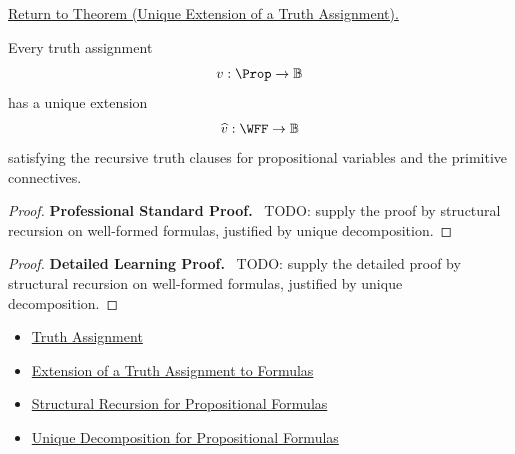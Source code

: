 \newpage
{}
\label{prf:unique-extension-truth-assignment-propositional-logic}

\begin{remark*}[Return]
\hyperref[thm:unique-extension-truth-assignment-propositional-logic]{Return to Theorem (Unique Extension of a Truth Assignment).}
\end{remark*}

\begin{theorem*}
Every truth assignment
\[
v:\Prop\to\mathbb{B}
\]
has a unique extension
\[
\widehat v:\WFF\to\mathbb{B}
\]
satisfying the recursive truth clauses for propositional variables and the
primitive connectives.
\end{theorem*}

\begin{proof}
\textbf{Professional Standard Proof.}~
TODO: supply the proof by structural recursion on well-formed formulas,
justified by unique decomposition.
\end{proof}

\begin{proof}
\textbf{Detailed Learning Proof.}~
TODO: supply the detailed proof by structural recursion on well-formed formulas,
justified by unique decomposition.
\end{proof}

\begin{remark*}
\end{remark*}

\begin{dependencies}
\begin{itemize}
  \item \hyperref[def:truth-assignment-propositional-logic]{Truth Assignment}
  \item \hyperref[def:extended-truth-assignment-propositional-logic]{Extension of a Truth Assignment to Formulas}
  \item \hyperref[thm:structural-recursion-propositional-formulas]{Structural Recursion for Propositional Formulas}
  \item \hyperref[thm:unique-decomposition-propositional-formulas]{Unique Decomposition for Propositional Formulas}
\end{itemize}
\end{dependencies}

\clearpage

